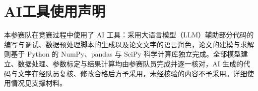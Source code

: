 
\newpage
\section*{AI工具使用声明}


本参赛队在竞赛过程中使用了 AI 工具：采用大语言模型（LLM）辅助部分代码的编写与调试、数据预处理脚本的生成以及论文文字的语言润色，论文的建模与求解则基于 Python 的 NumPy、pandas 与 SciPy 科学计算库独立完成。全部模型建立、数据处理、参数标定与结果计算均由参赛队员完成并逐一核对，AI 生成的代码与文字在经队员复核、修改合格后方予采用，未经核验的内容不予采用。详细使用情况见支撑材料。
